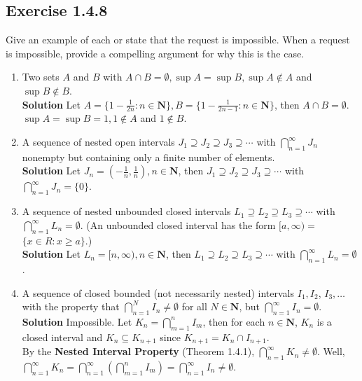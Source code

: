 \documentclass[12pt]{report}
\begin{document}
\subsection*{Exercise 1.4.8}
Give an example of each or state that the request is impossible. When a request is impossible, provide a compelling argument for why this is the case.
\begin{enumerate}[label=(\alph*)]
    \item Two sets $A$ and $B$ with $A \cap B=\emptyset, \sup A=\sup B, \sup A \notin A$ and $\sup B \notin B$.\\
    \textbf{Solution} Let $A = \{1-\frac{1}{2n}: n \in \mathbf{N}\}, B = \{1-\frac{1}{2n-1}: n \in \mathbf{N}\}$, then $A\cap B = \emptyset$. $\sup A = \sup B = 1, 1 \notin A$ and $1 \notin B$. 
    \item A sequence of nested open intervals $J_1 \supseteq J_2 \supseteq J_3 \supseteq \cdots$ with $\bigcap_{n=1}^{\infty} J_n$ nonempty but containing only a finite number of elements.\\
    \textbf{Solution} Let $J_n = (-\frac{1}{n},\frac{1}{n}), n\in \mathbf{N}$, then $J_1 \supseteq J_2 \supseteq J_3 \supseteq \cdots$ with $\bigcap_{n=1}^{\infty} J_n = \{0\}$.
    \item A sequence of nested unbounded closed intervals $L_1 \supseteq L_2 \supseteq L_3 \supseteq \cdots$ with $\bigcap_{n=1}^{\infty} L_n=\emptyset$. (An unbounded closed interval has the form $[a, \infty)=$ $\{x \in R: x \geq a\}$.)\\
    \textbf{Solution} Let $L_n = [n,\infty), n\in \mathbf{N}$, then $L_1 \supseteq L_2 \supseteq L_3 \supseteq \cdots$ with $\bigcap_{n=1}^{\infty} L_n=\emptyset$.
    \item A sequence of closed bounded (not necessarily nested) intervals $I_1, I_2$, $I_3, \ldots$ with the property that $\bigcap_{n=1}^N I_n \neq \emptyset$ for all $N \in \mathbf{N}$, but $\bigcap_{n=1}^{\infty} I_n=\emptyset$.\\
    \textbf{Solution} Impossible. Let $K_n = \bigcap_{m=1}^n I_m$, then for each $n \in \mathbf{N}$, $K_n$ is a closed interval and $K_n \subseteq K_{n+1}$ since $K_{n+1} = K_n \cap I_{n+1}$.\\
    By the \textbf{Nested Interval Property} (Theorem 1.4.1), $\bigcap_{n=1}^{\infty} K_n \neq \emptyset$. Well, $\bigcap_{n=1}^{\infty} K_n = \bigcap_{n=1}^{\infty} (\bigcap_{m=1}^n I_m) = \bigcap_{n=1}^{\infty} I_n \neq \emptyset$.
\end{enumerate}
\end{document}
